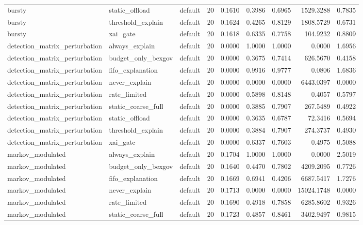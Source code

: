 \begin{table}[t]
\begin{tabular}{lllrrrrrr}
bursty & static\_offload & default & 20 & 0.1610 & 0.3986 & 0.6965 & 1529.3288 & 0.7835 \\
bursty & threshold\_explain & default & 20 & 0.1624 & 0.4265 & 0.8129 & 1808.5729 & 0.6731 \\
bursty & xai\_gate & default & 20 & 0.1618 & 0.6335 & 0.7758 & 104.9232 & 0.8809 \\
detection\_matrix\_perturbation & always\_explain & default & 20 & 0.0000 & 1.0000 & 1.0000 & 0.0000 & 1.6956 \\
detection\_matrix\_perturbation & budget\_only\_bexgov & default & 20 & 0.0000 & 0.3675 & 0.7414 & 626.5670 & 0.4158 \\
detection\_matrix\_perturbation & fifo\_explanation & default & 20 & 0.0000 & 0.9916 & 0.9777 & 0.0806 & 1.6836 \\
detection\_matrix\_perturbation & never\_explain & default & 20 & 0.0000 & 0.0000 & 0.0000 & 6443.0397 & 0.0000 \\
detection\_matrix\_perturbation & rate\_limited & default & 20 & 0.0000 & 0.5898 & 0.8148 & 0.4057 & 0.5797 \\
detection\_matrix\_perturbation & static\_coarse\_full & default & 20 & 0.0000 & 0.3885 & 0.7907 & 267.5489 & 0.4922 \\
detection\_matrix\_perturbation & static\_offload & default & 20 & 0.0000 & 0.3635 & 0.6787 & 72.3416 & 0.5694 \\
detection\_matrix\_perturbation & threshold\_explain & default & 20 & 0.0000 & 0.3884 & 0.7907 & 274.3737 & 0.4930 \\
detection\_matrix\_perturbation & xai\_gate & default & 20 & 0.0000 & 0.6337 & 0.7603 & 0.4975 & 0.5088 \\
markov\_modulated & always\_explain & default & 20 & 0.1704 & 1.0000 & 1.0000 & 0.0000 & 2.5019 \\
markov\_modulated & budget\_only\_bexgov & default & 20 & 0.1640 & 0.4470 & 0.7802 & 4209.2095 & 0.7726 \\
markov\_modulated & fifo\_explanation & default & 20 & 0.1669 & 0.6941 & 0.4206 & 6687.5417 & 1.7276 \\
markov\_modulated & never\_explain & default & 20 & 0.1713 & 0.0000 & 0.0000 & 15024.1748 & 0.0000 \\
markov\_modulated & rate\_limited & default & 20 & 0.1690 & 0.4918 & 0.7858 & 6285.8602 & 0.9326 \\
markov\_modulated & static\_coarse\_full & default & 20 & 0.1723 & 0.4857 & 0.8461 & 3402.9497 & 0.9815 \\

\end{tabular}
\end{table}
